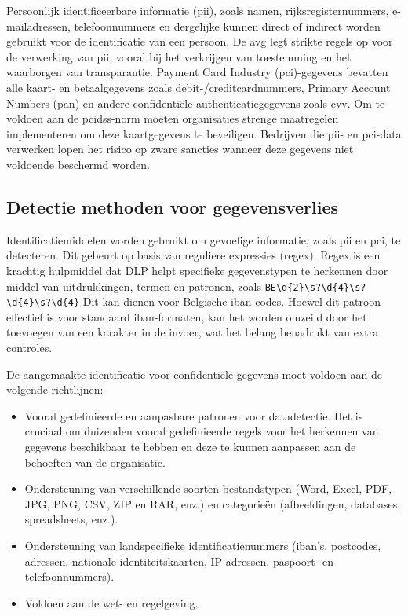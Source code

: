 Persoonlijk identificeerbare informatie (\gls{pii}), zoals namen, rijksregisternummers, e-mail\-adressen, telefoonnummers en dergelijke kunnen direct of indirect worden gebruikt voor de identificatie van een persoon. 
De \gls{avg} legt strikte regels op voor de verwerking van \gls{pii}, vooral bij het verkrijgen van toestemming en het waarborgen van transparantie.
Payment Card Industry (\gls{pci})-gegevens bevatten alle kaart- en betaalgegevens zoals debit-/creditcardnummers, Primary Account Numbers (\gls{pan}) en andere confidentiële authenticatiegegevens zoals \gls{cvv}. 
Om te voldoen aan de \gls{pcidss}-norm moeten organisaties strenge maatregelen implementeren om deze kaartgegevens te beveiligen. 
Bedrijven die \gls{pii}- en \gls{pci}-data verwerken lopen het risico op zware sancties wanneer deze gegevens niet voldoende beschermd worden.

\subsection{Detectie methoden voor gegevensverlies}

Identificatiemiddelen worden gebruikt om gevoelige informatie, zoals \gls{pii} en \gls{pci}, te detecteren. 
Dit gebeurt op basis van reguliere expressies (regex). 
Regex is een krachtig hulpmiddel dat DLP helpt specifieke gegevenstypen te herkennen door middel van uitdrukkingen, termen en patronen, 
zoals \texttt{BE\textbackslash d\{2\}\textbackslash s?\textbackslash d\{4\}\textbackslash s?\textbackslash d\{4\}\-\textbackslash s?\textbackslash d\{4\}} 
Dit kan dienen voor Belgische \gls{iban}-codes.
Hoewel dit patroon effectief is voor standaard \gls{iban}-formaten, 
kan het worden omzeild door het toevoegen van een karakter in de invoer, wat het belang benadrukt van extra controles. 

De aangemaakte identificatie voor confidentiële gegevens moet voldoen aan de volgende richtlijnen:

\begin{itemize}
    \item Vooraf gedefinieerde en aanpasbare patronen voor datadetectie. Het is cruciaal om duizenden vooraf gedefinieerde regels voor het herkennen van gegevens beschikbaar te hebben en deze te kunnen aanpassen aan de behoeften van de organisatie.
    \item Ondersteuning van verschillende soorten bestandstypen (Word, Excel, PDF, JPG, PNG, CSV, ZIP en RAR, enz.) en categorieën (afbeeldingen, databases, spreadsheets, enz.).
    \item Ondersteuning van landspecifieke identificatienummers (\gls{iban}'s, postcodes, adressen, nationale identiteitskaarten, IP-adressen, pas\-poort- en telefoonnummers).
    \item Voldoen aan de wet- en regelgeving.
\end{itemize}

